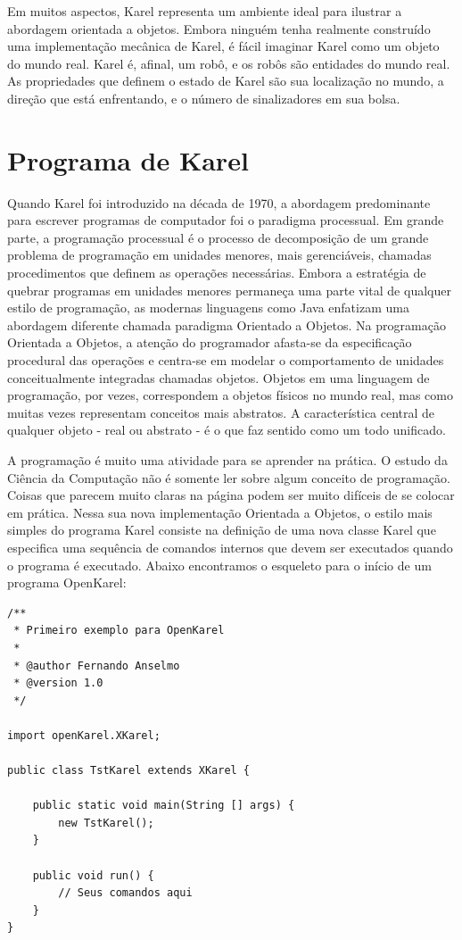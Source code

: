 \documentclass[a4paper,11pt]{article}
\begin{document}
Em muitos aspectos, Karel representa um ambiente ideal para ilustrar a abordagem orientada a objetos. Embora ninguém tenha realmente construído uma  implementação mecânica de Karel, é fácil imaginar Karel como um objeto do mundo real. Karel é, afinal, um robô, e os robôs são entidades do mundo real. As propriedades que definem o estado de Karel são sua localização no mundo, a direção que está enfrentando, e o número de sinalizadores em sua bolsa. 

\section{Programa de Karel}
Quando Karel foi introduzido na década de 1970, a abordagem predominante para escrever programas de computador foi o paradigma processual. Em grande parte, a programação processual é o processo de decomposição de um grande problema de programação em unidades menores, mais gerenciáveis, chamadas procedimentos que definem as operações necessárias. Embora a estratégia de quebrar programas em unidades menores permaneça uma parte vital de qualquer estilo de programação, as modernas linguagens como Java enfatizam uma abordagem diferente chamada paradigma Orientado a Objetos. Na programação Orientada a Objetos, a atenção do programador afasta-se da especificação procedural das operações e centra-se em modelar o comportamento de unidades conceitualmente integradas chamadas objetos. Objetos em uma linguagem de programação, por vezes, correspondem a objetos físicos no mundo real, mas como muitas vezes representam conceitos mais abstratos. A característica central de qualquer objeto - real ou abstrato - é o que faz sentido como um todo unificado.

A programação é muito uma atividade para se aprender na prática. O estudo da Ciência da Computação não é somente ler sobre algum conceito de programação. Coisas que parecem muito claras na página podem ser muito difíceis de se colocar em prática. Nessa sua nova implementação Orientada a Objetos, o estilo mais simples do programa Karel consiste na definição de uma nova classe Karel que especifica uma sequência de comandos internos que devem ser executados quando o programa é executado. Abaixo encontramos o esqueleto para o início de um programa OpenKarel:
\begin{lstlisting}
/**
 * Primeiro exemplo para OpenKarel
 * 
 * @author Fernando Anselmo
 * @version 1.0
 */

import openKarel.XKarel;

public class TstKarel extends XKarel {

    public static void main(String [] args) {
        new TstKarel();
    }
    
    public void run() {
        // Seus comandos aqui
    }
}
\end{lstlisting}
\end{document}

